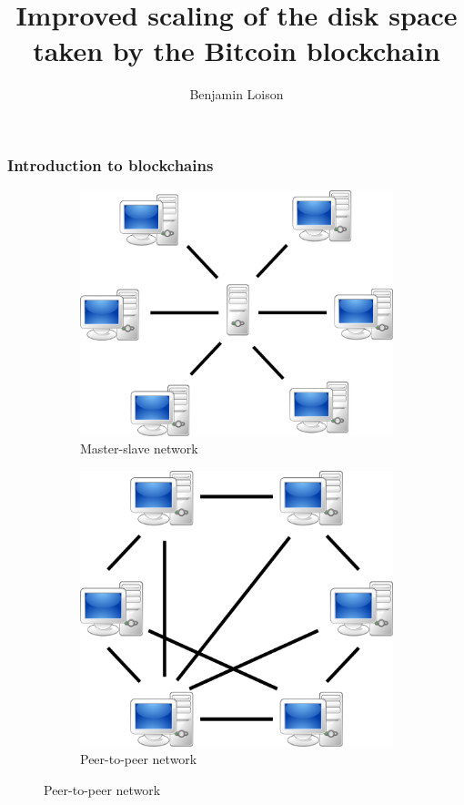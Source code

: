\documentclass{beamer}
\title{Improved scaling of the disk space taken by the Bitcoin blockchain}
\date{}%
\author{Benjamin Loison}
\begin{document}
\frame{\titlepage}


\begin{frame}

\frametitle{Introduction to blockchains}

\begin{figure}
\centering
\begin{subfigure}{.5\textwidth}
  \centering
  \includegraphics[width=.8\linewidth]{illustrationsSoutenance/clientServer.png}
  \caption{Master-slave network}
  \label{fig:sub1}
\end{subfigure}%
\begin{subfigure}{.5\textwidth}
  \centering
  \includegraphics[width=.8\linewidth]{illustrationsSoutenance/P2P.png}
  \caption{Peer-to-peer network}
  \label{fig:sub2}
\end{subfigure}
\end{figure}
\end{frame}
\end{document}
